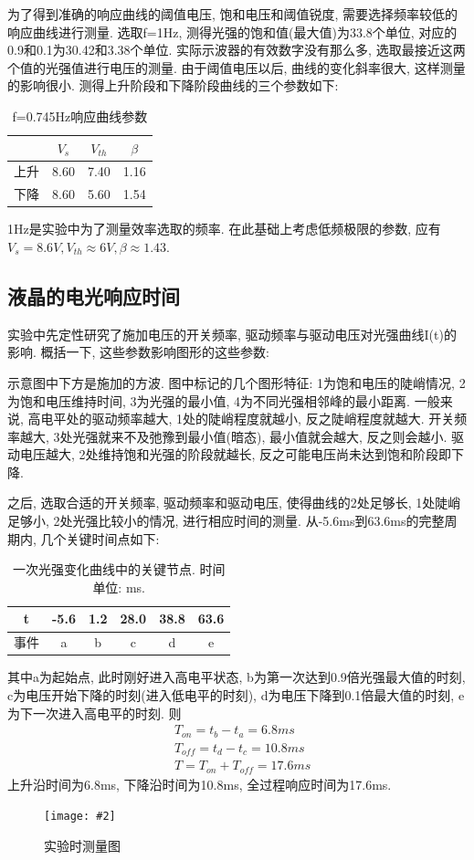 \documentclass[12pt,a4paper]{article}
\newcommand{\bfig}[3]{
    \begin{figure}[H]
        \centering
        \texttt{[image: \#2]}
        \caption{#3}
    \end{figure}
}
\begin{document}
为了得到准确的响应曲线的阈值电压, 饱和电压和阈值锐度, 需要选择频率较低的响应曲线进行测量. 
选取f=1Hz, 测得光强的饱和值(最大值)为33.8个单位, 对应的0.9和0.1为30.42和3.38个单位. 实际示波器的有效数字没有那么多, 选取最接近这两个值的光强值进行电压的测量. 由于阈值电压以后, 曲线的变化斜率很大, 这样测量的影响很小. 
测得上升阶段和下降阶段曲线的三个参数如下:
\begin{table}[H]
    \centering
    \begin{tabular}{|c|c|c|c|}
    \hline
       & $V_s$   & $V_{th}$  & $\beta$ \\ \hline
    上升 & 8.60 & 7.40 & 1.16 \\ \hline
    下降 & 8.60 & 5.60 & 1.54 \\ \hline
    \end{tabular}
    \caption{f=0.745Hz响应曲线参数}
    \end{table}
1Hz是实验中为了测量效率选取的频率. 在此基础上考虑低频极限的参数, 应有$V_s=8.6V, V_{th}\approx 6V, \beta\approx 1.43$. 

\subsection{液晶的电光响应时间}
实验中先定性研究了施加电压的开关频率, 驱动频率与驱动电压对光强曲线I(t)的影响. 概括一下, 这些参数影响图形的这些参数: 

示意图中下方是施加的方波. 图中标记的几个图形特征: 1为饱和电压的陡峭情况, 2为饱和电压维持时间, 3为光强的最小值, 4为不同光强相邻峰的最小距离. 
一般来说, 高电平处的驱动频率越大, 1处的陡峭程度就越小, 反之陡峭程度就越大. 开关频率越大, 3处光强就来不及弛豫到最小值(暗态), 最小值就会越大, 反之则会越小. 驱动电压越大, 2处维持饱和光强的阶段就越长, 反之可能电压尚未达到饱和阶段即下降. 

之后, 选取合适的开关频率, 驱动频率和驱动电压, 使得曲线的2处足够长, 1处陡峭足够小, 2处光强比较小的情况, 进行相应时间的测量. 从-5.6ms到63.6ms的完整周期内, 几个关键时间点如下: 
\begin{table}[H]
    \centering
    \begin{tabular}{|c|c|c|c|c|c|}
    \hline
    t&-5.6 & 1.2 & 28.0 & 38.8 & 63.6 \\ \hline
    事件&a    & b   & c  & d    & e    \\ \hline
    \end{tabular}
    \caption{一次光强变化曲线中的关键节点. 时间单位: ms. }
    \end{table}
其中a为起始点, 此时刚好进入高电平状态, b为第一次达到0.9倍光强最大值的时刻, c为电压开始下降的时刻(进入低电平的时刻), d为电压下降到0.1倍最大值的时刻, e为下一次进入高电平的时刻. 
则
\begin{align}
&T_{on}=t_{b}-t_{a}=6.8ms\\
&T_{off}=t_{d}-t_{c}=10.8ms\\
&T=T_{on}+T_{off}=17.6ms
\end{align}
上升沿时间为6.8ms, 下降沿时间为10.8ms, 全过程响应时间为17.6ms. 
\bfig{0.5}{响应时间示意.jpg}{实验时测量图}
\end{document}
